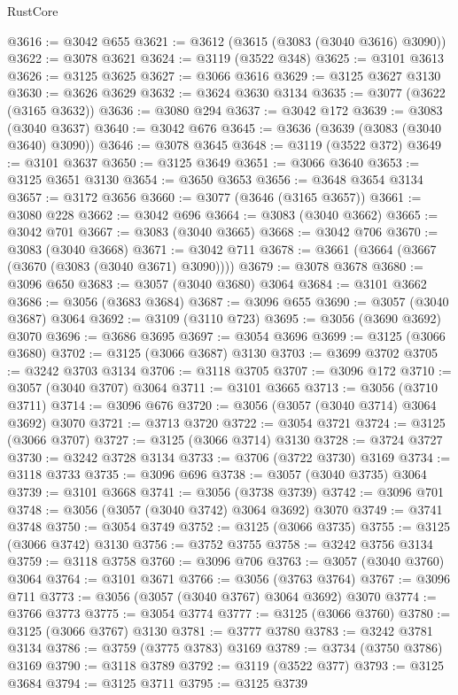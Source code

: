 \begin{lexlean}{RustCore}
\begin{coremodule}
@3616 := @3042 @655
@3621 := @3612 (@3615 (@3083 (@3040 @3616) @3090))
@3622 := @3078 @3621
@3624 := @3119 (@3522 @348)
@3625 := @3101 @3613
@3626 := @3125 @3625
@3627 := @3066 @3616
@3629 := @3125 @3627 @3130
@3630 := @3626 @3629
@3632 := @3624 @3630 @3134
@3635 := @3077 (@3622 (@3165 @3632))
@3636 := @3080 @294
@3637 := @3042 @172
@3639 := @3083 (@3040 @3637)
@3640 := @3042 @676
@3645 := @3636 (@3639 (@3083 (@3040 @3640) @3090))
@3646 := @3078 @3645
@3648 := @3119 (@3522 @372)
@3649 := @3101 @3637
@3650 := @3125 @3649
@3651 := @3066 @3640
@3653 := @3125 @3651 @3130
@3654 := @3650 @3653
@3656 := @3648 @3654 @3134
@3657 := @3172 @3656
@3660 := @3077 (@3646 (@3165 @3657))
@3661 := @3080 @228
@3662 := @3042 @696
@3664 := @3083 (@3040 @3662)
@3665 := @3042 @701
@3667 := @3083 (@3040 @3665)
@3668 := @3042 @706
@3670 := @3083 (@3040 @3668)
@3671 := @3042 @711
@3678 := @3661 (@3664 (@3667 (@3670 (@3083 (@3040 @3671) @3090))))
@3679 := @3078 @3678
@3680 := @3096 @650
@3683 := @3057 (@3040 @3680) @3064
@3684 := @3101 @3662
@3686 := @3056 (@3683 @3684)
@3687 := @3096 @655
@3690 := @3057 (@3040 @3687) @3064
@3692 := @3109 (@3110 @723)
@3695 := @3056 (@3690 @3692) @3070
@3696 := @3686 @3695
@3697 := @3054 @3696
@3699 := @3125 (@3066 @3680)
@3702 := @3125 (@3066 @3687) @3130
@3703 := @3699 @3702
@3705 := @3242 @3703 @3134
@3706 := @3118 @3705
@3707 := @3096 @172
@3710 := @3057 (@3040 @3707) @3064
@3711 := @3101 @3665
@3713 := @3056 (@3710 @3711)
@3714 := @3096 @676
@3720 := @3056 (@3057 (@3040 @3714) @3064 @3692) @3070
@3721 := @3713 @3720
@3722 := @3054 @3721
@3724 := @3125 (@3066 @3707)
@3727 := @3125 (@3066 @3714) @3130
@3728 := @3724 @3727
@3730 := @3242 @3728 @3134
@3733 := @3706 (@3722 @3730) @3169
@3734 := @3118 @3733
@3735 := @3096 @696
@3738 := @3057 (@3040 @3735) @3064
@3739 := @3101 @3668
@3741 := @3056 (@3738 @3739)
@3742 := @3096 @701
@3748 := @3056 (@3057 (@3040 @3742) @3064 @3692) @3070
@3749 := @3741 @3748
@3750 := @3054 @3749
@3752 := @3125 (@3066 @3735)
@3755 := @3125 (@3066 @3742) @3130
@3756 := @3752 @3755
@3758 := @3242 @3756 @3134
@3759 := @3118 @3758
@3760 := @3096 @706
@3763 := @3057 (@3040 @3760) @3064
@3764 := @3101 @3671
@3766 := @3056 (@3763 @3764)
@3767 := @3096 @711
@3773 := @3056 (@3057 (@3040 @3767) @3064 @3692) @3070
@3774 := @3766 @3773
@3775 := @3054 @3774
@3777 := @3125 (@3066 @3760)
@3780 := @3125 (@3066 @3767) @3130
@3781 := @3777 @3780
@3783 := @3242 @3781 @3134
@3786 := @3759 (@3775 @3783) @3169
@3789 := @3734 (@3750 @3786) @3169
@3790 := @3118 @3789
@3792 := @3119 (@3522 @377)
@3793 := @3125 @3684
@3794 := @3125 @3711
@3795 := @3125 @3739

\end{coremodule}
\end{lexlean}
